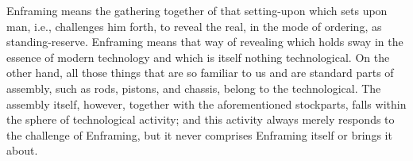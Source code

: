 Enframing means the gathering together of that setting-upon which sets upon man, i.e., challenges him forth, to reveal the real, in the mode of ordering, as standing-reserve. Enframing means that way of revealing which holds sway in the essence of modern technology and which is itself nothing technological. On the other hand, all those things that are so familiar to us and are standard parts of assembly, such as rods, pistons, and chassis, belong to the technological. The assembly itself, however, together with the aforementioned stockparts, falls within the sphere of technological activity; and this activity always merely responds to the challenge of Enframing, but it never comprises Enframing itself or brings it about.

